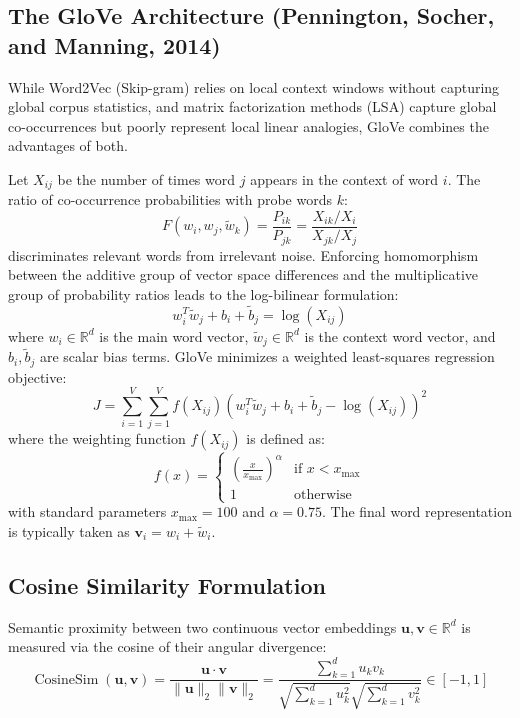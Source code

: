 \documentclass[12pt,a4paper]{report}
\begin{document}
\subsection{The GloVe Architecture (Pennington, Socher, and Manning, 2014)}
While Word2Vec (Skip-gram) relies on local context windows without capturing global corpus statistics, and matrix factorization methods (LSA) capture global co-occurrences but poorly represent local linear analogies, GloVe combines the advantages of both.

Let $X_{ij}$ be the number of times word $j$ appears in the context of word $i$. The ratio of co-occurrence probabilities with probe words $k$:
\begin{equation}
    F(w_i, w_j, \tilde{w}_k) = \frac{P_{ik}}{P_{jk}} = \frac{X_{ik} / X_i}{X_{jk} / X_j}
\end{equation}
discriminates relevant words from irrelevant noise. Enforcing homomorphism between the additive group of vector space differences and the multiplicative group of probability ratios leads to the log-bilinear formulation:
\begin{equation}
    w_i^T \tilde{w}_j + b_i + \tilde{b}_j = \log(X_{ij})
\end{equation}
where $w_i \in \mathbb{R}^d$ is the main word vector, $\tilde{w}_j \in \mathbb{R}^d$ is the context word vector, and $b_i, \tilde{b}_j$ are scalar bias terms. GloVe minimizes a weighted least-squares regression objective:
\begin{equation}
    J = \sum_{i=1}^{V} \sum_{j=1}^{V} f(X_{ij}) \left( w_i^T \tilde{w}_j + b_i + \tilde{b}_j - \log(X_{ij}) \right)^2
\end{equation}
where the weighting function $f(X_{ij})$ is defined as:
\begin{equation}
    f(x) = \begin{cases} \left(\frac{x}{x_{\max}}\right)^\alpha & \text{if } x < x_{\max} \\ 1 & \text{otherwise} \end{cases}
\end{equation}
with standard parameters $x_{\max} = 100$ and $\alpha = 0.75$. The final word representation is typically taken as $\mathbf{v}_i = w_i + \tilde{w}_i$.

\subsection{Cosine Similarity Formulation}
Semantic proximity between two continuous vector embeddings $\mathbf{u}, \mathbf{v} \in \mathbb{R}^d$ is measured via the cosine of their angular divergence:
\begin{equation}
    \operatorname{CosineSim}(\mathbf{u}, \mathbf{v}) = \frac{\mathbf{u} \cdot \mathbf{v}}{\|\mathbf{u}\|_2 \|\mathbf{v}\|_2} = \frac{\sum_{k=1}^d u_k v_k}{\sqrt{\sum_{k=1}^d u_k^2} \sqrt{\sum_{k=1}^d v_k^2}} \in [-1, 1]
\end{equation}
\end{document}
